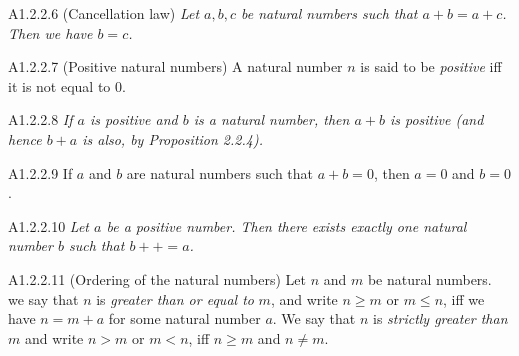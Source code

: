 \begin{proposition}{A1.2.2.6}
    (Cancellation law) \emph{Let $a, b, c$ be natural numbers such that $a+b=a+c$. Then we have $b=c$.}
\end{proposition}

\begin{definition}{A1.2.2.7}
    (Positive natural numbers) A natural number $n$ is said to be \emph{positive} iff it is not equal to 0.
\end{definition}

\begin{proposition}{A1.2.2.8}
    \emph{If $a$ is positive and $b$ is a natural number, then $a+b$ is positive (and hence $b+a$ is also, by Proposition 2.2.4).}
\end{proposition}

\begin{corollary}{A1.2.2.9}
    If $a$ and $b$ are natural numbers such that $a+b=0$, then $a=0$ and $b=0$.
\end{corollary}

\begin{lemma}{A1.2.2.10}
    \emph{Let $a$ be a positive number. Then there exists exactly one natural number $b$ such that $b++ = a$.}
\end{lemma}

\begin{definition}{A1.2.2.11}
    (Ordering of the natural numbers) Let $n$ and $m$ be natural numbers. we say that $n$ is \emph{greater than or equal to} $m$, and write $n \geq m$ or $m \leq n$, iff we have $n = m + a$ for some natural number $a$. We say that $n$ is \emph{strictly greater than $m$} and write $n > m$ or $m < n$, iff $n \geq m$ and $n \neq m$.
\end{definition}


